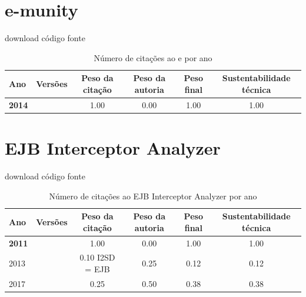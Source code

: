 \section{e-munity}
\checkmark download
\checkmark código fonte


\begin{table}[H]
\caption{Número de citações ao e por ano}
\centering
\begin{tabular}{| l | c | c | c | c | c |}
  \hline
  Ano & Versões & Peso da citação & Peso da autoria & Peso final & Sustentabilidade técnica \\
  \hline
            {\bf 2014}
          &
          
          &
          1.00
          &
          0.00
          &
          1.00
          &
            {\color{blue} 1.00}
          \\
\hline
\end{tabular}
\end{table}



\section{EJB Interceptor Analyzer}
\checkmark download
\checkmark código fonte


\begin{table}[H]
\caption{Número de citações ao EJB Interceptor Analyzer por ano}
\centering
\begin{tabular}{| l | c | c | c | c | c |}
  \hline
  Ano & Versões & Peso da citação & Peso da autoria & Peso final & Sustentabilidade técnica \\
  \hline
            {\bf 2011}
          &
          
          &
          1.00
          &
          0.00
          &
          1.00
          &
            {\color{blue} 1.00}
          \\
\hline
            2013
          &
          
          &
          0.10
            {\tiny I2SD = EJB}
          &
          0.25
          &
          0.12
          &
            {\color{red} 0.12}
          \\
\hline
            2017
          &
          
          &
          0.25
          &
          0.50
          &
          0.38
          &
            {\color{red} 0.38}
          \\
\hline
\end{tabular}
\end{table}



